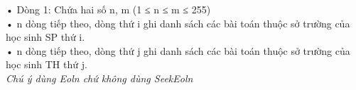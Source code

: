 • Dòng 1: Chứa hai số n, m (1 ≤ n ≤ m ≤ 255)   
\\   • n dòng tiếp theo, dòng thứ i ghi danh sách các bài toán thuộc sở trường của học sinh SP thứ i.   
\\   • n dòng tiếp theo, dòng thứ j ghi danh sách các bài toán thuộc sở trường của học sinh TH thứ j.   
\\\textit{    Chú ý dùng         Eoln        chứ không dùng         SeekEoln       }
\\